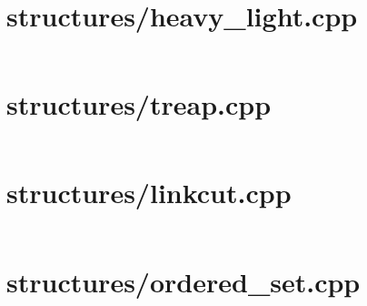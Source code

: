 \newpage
\section{structures/heavy\_light.cpp}
\fontsize{7.9}{8.5}\selectfont
\inputminted[numbersep=1pt,linenos,breaklines]{c++}{/home/ifsmirnov/olymp/teambook/tmp.qSsNloJNks/tmp.6xpS4Dx1KO}

\newpage
\section{structures/treap.cpp}
\fontsize{7.9}{8.5}\selectfont
\inputminted[numbersep=1pt,linenos,breaklines]{c++}{/home/ifsmirnov/olymp/teambook/tmp.qSsNloJNks/tmp.RdD6Nbicb1}

\newpage
\section{structures/linkcut.cpp}
\fontsize{7.9}{8.5}\selectfont
\inputminted[numbersep=1pt,linenos,breaklines]{c++}{/home/ifsmirnov/olymp/teambook/tmp.qSsNloJNks/tmp.DhSf4j6vQy}

\section{structures/ordered\_set.cpp}
\fontsize{7.9}{8.5}\selectfont
\inputminted[numbersep=1pt,linenos,breaklines]{c++}{algo/structures/ordered_set.cpp}

